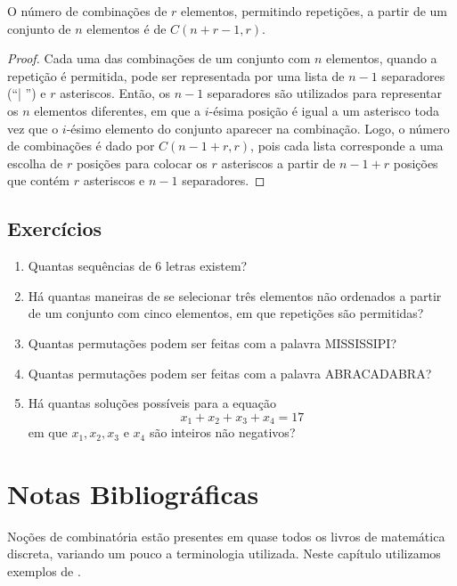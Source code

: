 \begin{Theorem}
O número de combinações de $r$ elementos, permitindo repetições, a
partir de um conjunto de $n$ elementos é de $C(n + r - 1, r)$.
\end{Theorem}
\begin{proof}
Cada uma das combinações de um conjunto com $n$ elementos, quando a
repetição é permitida, pode ser representada por uma lista de $n -1$
separadores (``| '') e $r$ asteriscos. Então, os $n - 1$ separadores
são utilizados para representar os $n$ elementos diferentes, em que a
$i$-ésima posição é igual a um asterisco toda vez que o $i$-ésimo
elemento do conjunto aparecer na combinação. Logo, o número de
combinações é dado por $C(n - 1 + r,r)$, pois cada lista corresponde a
uma escolha de $r$ posições para colocar os $r$ asteriscos a partir de
$n - 1 + r$ posições que contém $r$ asteriscos e $n - 1$ separadores.
\end{proof}

\subsection{Exercícios}

\begin{enumerate}
  \item Quantas sequências de 6 letras existem?
  \item Há quantas maneiras de se selecionar três elementos não
    ordenados a partir de um conjunto com cinco elementos, em que
    repetições são permitidas?
  \item Quantas permutações podem ser feitas com a palavra MISSISSIPI?
  \item Quantas permutações podem ser feitas com a palavra
    ABRACADABRA?
  \item Há quantas soluções possíveis para a equação
   \[x_1 + x_2 + x_3 + x_4 = 17\]
   em que $x_1,x_2,x_3$ e $x_4$ são inteiros não negativos?
\end{enumerate}

\section{Notas Bibliográficas}

Noções de combinatória estão presentes em quase todos os livros de
matemática discreta, variando um pouco a terminologia utilizada. Neste
capítulo utilizamos exemplos de \cite{Rosen02}.